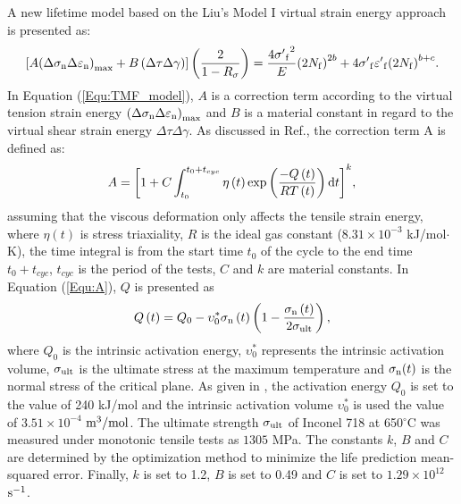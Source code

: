 A new lifetime model based on the Liu's Model I virtual strain energy approach is presented as:
\begin{equation}
\left[ {A{{\left( {\Delta {\sigma _{\rm n}}\Delta {\varepsilon _{\rm n}}} \right)}_{\max }} + B\left( {\Delta \tau \Delta \gamma } \right)} \right]\left( {\frac{2}{{1 - {R_\sigma }}}} \right)
= \frac{{4{{\sigma '}_{\rm f}}^2}}{E}{\left( {2{N_{\rm f}}} \right)^{2b}} + 4{{\sigma '}_{\rm f}}{{\varepsilon '}_{\rm f}}{\left( {2{N_{\rm f}}} \right)^{b + c}}.
\label{Equ:TMF_model}
\end{equation}
In Equation (\ref{Equ:TMF_model}), $A$ is a correction term according to the virtual tension strain energy ${{\left( {\Delta {\sigma _{\rm n}}\Delta {\varepsilon _{\rm n}}} \right)}_{\max }}$ and $B$ is a material constant in regard to the virtual shear strain energy ${\Delta \tau \Delta \gamma }$.
As discussed in Ref.\cite{Vose2013}, the correction term A is defined as:
\begin{equation}
A = {\left[ {1 + C\int_{{t_0}}^{{t_0} + {t_{cyc}}} {\eta \left( t \right)\exp \left( {\frac{{ - Q\left( t \right)}}{{RT\left( t \right)}}} \right){\rm{d}}t} } \right]^k},
\label{Equ:A}
\end{equation}
assuming that the viscous deformation only affects the tensile strain energy, where $\eta \left( t \right)$ is stress triaxiality, $R$ is the ideal gas constant ($8.31\times10^{-3}$ kJ/mol$\cdot$K), the time integral is from the start time $t_0$ of the cycle to the end time $t_0 + t_{cyc}$, $t_{cyc}$ is the period of the tests, $C$ and $k$ are material constants.
In Equation (\ref{Equ:A}), $Q$ is presented \cite{Warren2006,Warren2008} as
\begin{equation}
Q\left( t \right) = {Q_0} - \upsilon _0^*{\sigma _{\rm n}}\left( t \right)\left( {1 - \frac{{{\sigma _{\rm n}}\left( t \right)}}{{2{\sigma _{\rm{ult}}}}}} \right),
\label{Equ:creep_activation_energy}
\end{equation}
where $Q_0$ is the intrinsic activation energy, $\upsilon _0^*$ represents the intrinsic activation volume, $\sigma_{\rm ult}$ is the ultimate stress at the maximum temperature and $\sigma_{\rm n}(t)$ is the normal stress of the critical plane.
As given in \cite{Warren2008}, the activation energy $Q_0$ is set to the value of 240 kJ/mol and the intrinsic activation volume $\upsilon _0^*$ is used the value of $3.51\times10^{-4}$ $\rm{m}^{3}/\rm{mol}$. The ultimate strength $\sigma_{\rm{ult}}$ of Inconel 718 at 650$^\circ$C was measured under monotonic tensile tests as $1305$ MPa. The constants $k$, $B$ and $C$ are determined by the optimization method to minimize the life prediction mean-squared error. Finally, $k$ is set to 1.2, $B$ is set to 0.49 and $C$ is set to $1.29\times10^{12}$ $\rm{s}^{-1}$.

